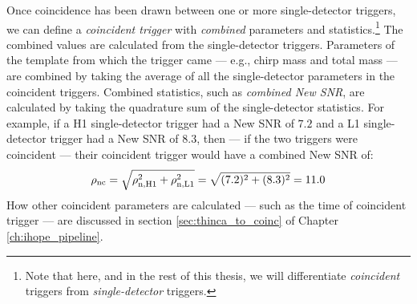 Once coincidence has been drawn between one or more single-detector triggers, we can define a \emph{coincident trigger} with \emph{combined} parameters and statistics.\footnote{Note that here, and in the rest of this thesis, we will differentiate \emph{coincident} triggers from \emph{single-detector} triggers.} The combined values are calculated from the single-detector triggers. Parameters of the template from which the trigger came --- e.g., chirp mass and total mass --- are combined by taking the average of all the single-detector parameters in the coincident triggers. Combined statistics, such as \emph{combined New \ac{SNR}}, are calculated by taking the quadrature sum of the single-detector statistics. For example, if a H1 single-detector trigger had a New \ac{SNR} of $7.2$ and a L1 single-detector trigger had a New \ac{SNR} of $8.3$, then --- if the two triggers were coincident --- their coincident trigger would have a combined New \ac{SNR} of:
\begin{equation*}
\rho_{\mathrm{nc}} = \sqrt{\rho_{\mathrm{n,H1}}^2 + \rho_{\mathrm{n,L1}}^2} = \sqrt{(7.2)^2 + (8.3)^2} = 11.0
\end{equation*}
How other coincident parameters are calculated --- such as the time of coincident trigger --- are discussed in section \ref{sec:thinca_to_coinc} of Chapter \ref{ch:ihope_pipeline}.

